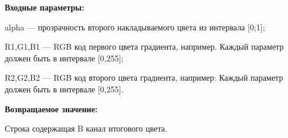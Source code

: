 \textbf{Входные параметры:}  

alpha --- прозрачность второго накладываемого цвета из интервала [0;1];
 
    R1,G1,B1 --- RGB код первого цвета градиента, например. Каждый параметр должен быть в интервале [0,255];
 
    R2,G2,B2 --- RGB код второго цвета градиента, например: Каждый параметр должен быть в интервале [0,255].

\textbf{Возвращаемое значение:}

Строка содержащая B канал итогового цвета.